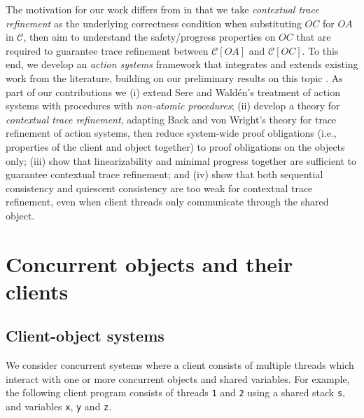 \documentclass[11pt]{llncs}
\newcommand{\mcC}{\mathcal{C}}
\begin{document}
The motivation for our work differs from \cite{GY11,LiangHFS13} in
that we take \emph{contextual trace refinement} as the underlying
correctness condition when substituting $OC$ for $OA$ in $\mcC$, then
aim to understand the safety/progress properties on $OC$ that are
required to guarantee trace refinement between $\mcC[OA]$ and
$\mcC[OC]$. To this end, we develop an \emph{action systems} framework
that integrates and extends existing work \cite{SereW00,back94trace}
from the literature, building on our preliminary results on this topic
\cite{DG15-REFINE}.  As part of our contributions we (i) extend Sere
and Wald\'en's treatment of action systems with procedures
\cite{SereW00} with \emph{non-atomic procedures}; (ii) develop a
theory for \emph{contextual trace refinement}, adapting Back and von
Wright's \cite{back94trace} theory for trace refinement of action
systems, then reduce system-wide proof obligations (i.e., properties
of the client and object together) to proof obligations on the objects
only; (iii) show that linearizability \cite{Herlihy90} and minimal progress
\cite{HS11} together are sufficient to guarantee contextual trace
refinement; and (iv) show that both sequential consistency and
quiescent consistency are too weak for contextual trace refinement,
even when client threads only communicate through the shared
object.

\vspace{-2mm}




\section{Concurrent objects and their clients}
\label{sec:concurrent-objects}



\vspace{-1mm}


\subsection{Client-object systems}
\label{sec:exampl-treib-stack}

We consider concurrent systems where a client consists of multiple
threads which interact with one or more concurrent objects and shared
variables.  For example, the following client program consists of threads
{\tt 1} and {\tt 2} using a shared stack {\tt s}, and variables {\tt x}, 
{\tt y} and {\tt z}.\smallskip
\end{document}

